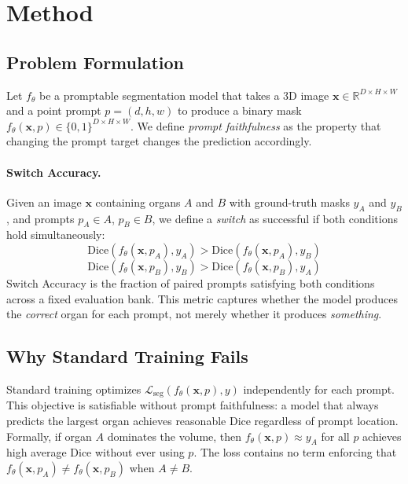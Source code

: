 \section{Method}

\subsection{Problem Formulation}

Let $f_\theta$ be a promptable segmentation model that takes a 3D image $\mathbf{x} \in \mathbb{R}^{D \times H \times W}$ and a point prompt $p = (d, h, w)$ to produce a binary mask $f_\theta(\mathbf{x}, p) \in \{0,1\}^{D \times H \times W}$. We define \emph{prompt faithfulness} as the property that changing the prompt target changes the prediction accordingly.

\paragraph{Switch Accuracy.}
Given an image $\mathbf{x}$ containing organs $A$ and $B$ with ground-truth masks $y_A$ and $y_B$, and prompts $p_A \in A$, $p_B \in B$, we define a \emph{switch} as successful if both conditions hold simultaneously:
\begin{equation}
\text{Dice}(f_\theta(\mathbf{x}, p_A), y_A) > \text{Dice}(f_\theta(\mathbf{x}, p_A), y_B)
\label{eq:switch1}
\end{equation}
\begin{equation}
\text{Dice}(f_\theta(\mathbf{x}, p_B), y_B) > \text{Dice}(f_\theta(\mathbf{x}, p_B), y_A)
\label{eq:switch2}
\end{equation}
Switch Accuracy is the fraction of paired prompts satisfying both conditions across a fixed evaluation bank. This metric captures whether the model produces the \emph{correct} organ for each prompt, not merely whether it produces \emph{something}.

\subsection{Why Standard Training Fails}

Standard training optimizes $\mathcal{L}_{\text{seg}}(f_\theta(\mathbf{x}, p), y)$ independently for each prompt. This objective is satisfiable without prompt faithfulness: a model that always predicts the largest organ achieves reasonable Dice regardless of prompt location. Formally, if organ $A$ dominates the volume, then $f_\theta(\mathbf{x}, p) \approx y_A$ for all $p$ achieves high average Dice without ever using $p$. The loss contains no term enforcing that $f_\theta(\mathbf{x}, p_A) \neq f_\theta(\mathbf{x}, p_B)$ when $A \neq B$.

